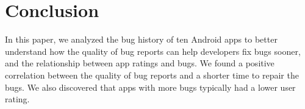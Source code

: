 \documentclass{sig-alternate}
\begin{document}









\section{Conclusion}
\label{sec:conclusion}

In this paper, we analyzed the bug history of ten Android apps to better understand how the quality of bug reports can help developers fix bugs sooner, and the relationship between app ratings and bugs. We found a positive correlation between the quality of bug reports and a shorter time to repair the bugs. We also discovered that apps with more bugs typically had a lower user rating.






\balance



\end{document}
